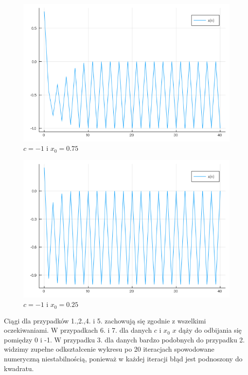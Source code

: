 \documentclass{article}
\begin{document}
\begin{figure}[H]
	\includegraphics[width=\linewidth]{zad6_6.png}
	\caption{$c=-1$ i $x_{0}=0.75$}
	\label{fig:z66}
\end{figure}
\begin{figure}[H]
	\includegraphics[width=\linewidth]{zad6_7.png}
	\caption{$c=-1$ i $x_{0}=0.25$}
	\label{fig:z67}
\end{figure}
Ciągi dla przypadków 1.,2.,4. i 5. zachowują się zgodnie z wszelkimi oczekiwaniami. W przypadkach 6. i 7. dla danych $c$ i $x_{0}$ $x$ dąży do odbijania się pomiędzy 0 i -1. W przypadku 3. dla danych bardzo podobnych do przypadku 2. widzimy zupełne odkształcenie wykresu po 20 iteracjach spowodowane numeryczną niestabilnością, ponieważ w każdej iteracji błąd jest podnoszony do kwadratu.
\end{document}
